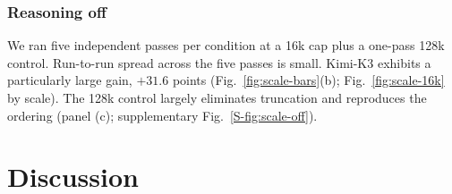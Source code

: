 \documentclass[journal]{IEEEtran}
\begin{document}
\subsubsection{Reasoning off} We ran five independent
passes per condition at a 16k cap plus a one-pass 128k control. Run-to-run spread across the
five passes is small. Kimi-K3 exhibits a particularly large gain, $+31.6$ points
(Fig.~\ref{fig:scale-bars}(b); Fig.~\ref{fig:scale-16k} by scale). The 128k control largely
eliminates truncation and reproduces the ordering (panel (c); supplementary Fig.~\ref{S-fig:scale-off}).

\section{Discussion}
\label{sec:discussion}
\end{document}
